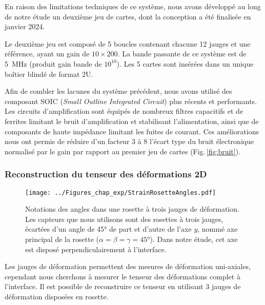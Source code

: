 
En raison des limitations techniques de ce système, nous avons développé au long de notre étude un deuxième jeu de cartes, dont la conception a été finalisée en janvier 2024.



Le deuxième jeu est composé de 5 boucles contenant chacune 12 jauges et une référence, ayant un gain de $10\times200$. La bande passante de ce système est de \SI{5}{\mega\hertz} (produit gain bande de $10^{10}$). Les 5 cartes sont insérées dans un unique boîtier blindé de format 2U.

Afin de combler les lacunes du système précédent, nous avons utilisé des composant SOIC (\textit{Small Outline Integrated Circuit}) plus récents et performants. Les circuits d'amplification sont équipés de nombreux filtres capacitifs et de ferrites limitant le bruit d'amplification et stabilisant l'alimentation, ainsi que de composants de haute impédance limitant les fuites de courant. Ces améliorations nous ont permis de réduire d'un facteur 3 à 8 l'écart type du bruit électronique normalisé par le gain par rapport au premier jeu de cartes (Fig.\,\ref{fig:bruit}).






\subsubsection{Reconstruction du tenseur des déformations 2D}



\begin{figure}[htb]
\centering	
\texttt{[image: ../Figures\_chap\_exp/StrainRosetteAngles.pdf]}
\caption[Reconstruction du tenseur des déformations]{Notations des angles dans une rosette à trois jauges de déformation. Les capteurs que nous utilisons sont des rosettes à trois jauges, écartées d'un angle de \ang{45} de part et d'autre de l'axe $y$, nommé axe principal de la rosette ($\alpha=\beta=\gamma=\ang{45}$). Dans notre étude, cet axe est disposé perpendiculairement à l'interface.}
\label{fig:anglerosette}
\end{figure}





Les jauges de déformation permettent des mesures de déformation uni-axiales, cependant nous cherchons à mesurer le tenseur des déformations complet à l'interface. Il est possible de reconstruire ce tenseur en utilisant 3 jauges de déformation disposées en rosette.

